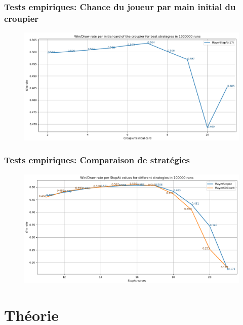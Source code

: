 \documentclass{beamer}
\begin{document}
\begin{frame}
    \frametitle{Tests empiriques: Chance du joueur par main initial du croupier}
    \begin{figure}[H]
        \begin{center}
            \includegraphics[width=1\textwidth]{empirical_graph2}
        \end{center}
    \end{figure}
\end{frame}

\begin{frame}
    \frametitle{Tests empiriques: Comparaison de stratégies}
    \begin{figure}[H]
        \begin{center}
            \includegraphics[width=1\textwidth]{empirical_graph3}
        \end{center}
    \end{figure}
\end{frame}

\section{Théorie}
\end{document}
